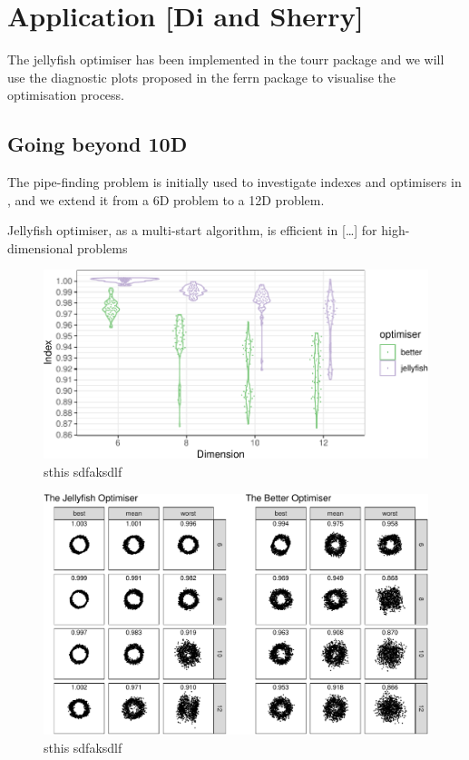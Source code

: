 \documentclass[
  number,
  preprint,
  3p]{elsarticle}
\begin{document}
\section{Application {[}Di and Sherry{]}}\label{sec-simulation}

The jellyfish optimiser has been implemented in the tourr package
\citep{wickham_tourr_2011} and we will use the diagnostic plots proposed
in the ferrn package \citep{RJ-2021-105} to visualise the optimisation
process.

\subsection{Going beyond 10D}\label{going-beyond-10d}

The pipe-finding problem is initially used to investigate indexes and
optimisers in \citet{laa_using_2020}, and we extend it from a 6D problem
to a 12D problem.

Jellyfish optimiser, as a multi-start algorithm, is efficient in
{[}\ldots{]} for high-dimensional problems

\begin{figure}[H]

{\centering \includegraphics{optim_files/figure-pdf/unnamed-chunk-2-1.pdf}

}

\caption{sthis sdfaksdlf}

\end{figure}%

\begin{figure}[H]

{\centering \includegraphics{optim_files/figure-pdf/unnamed-chunk-3-1.pdf}

}

\caption{sthis sdfaksdlf}

\end{figure}%
\end{document}
